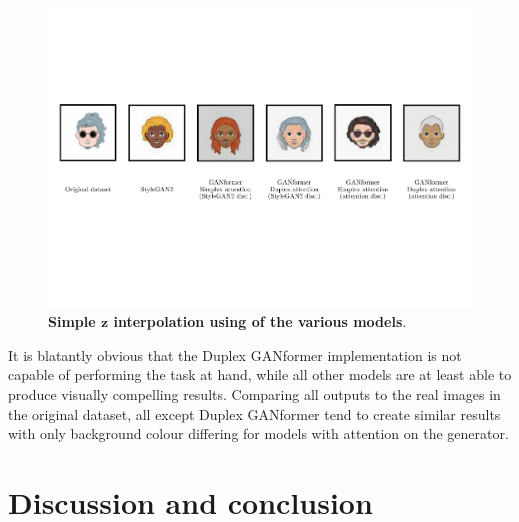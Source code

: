 \documentclass{article}
\begin{document}
	\begin{figure}[htb]
		\centering
		\includegraphics[width=.9\linewidth]{imgAll}
		\caption{\textbf{Simple $\mathbf{z}$ interpolation using of the various models}.} 
		\label{fig:summaryImgs}
	\end{figure}
	
	It is blatantly obvious that the Duplex GANformer implementation is not capable of performing the 
	task at hand, while all other models are at least able to produce visually compelling results.
	Comparing all outputs to the real images in the original dataset, all except Duplex GANformer tend to 
	create similar results with only background colour differing for models with attention on the 
	generator.
	
	\section{Discussion and conclusion}
	
	
\end{document}
